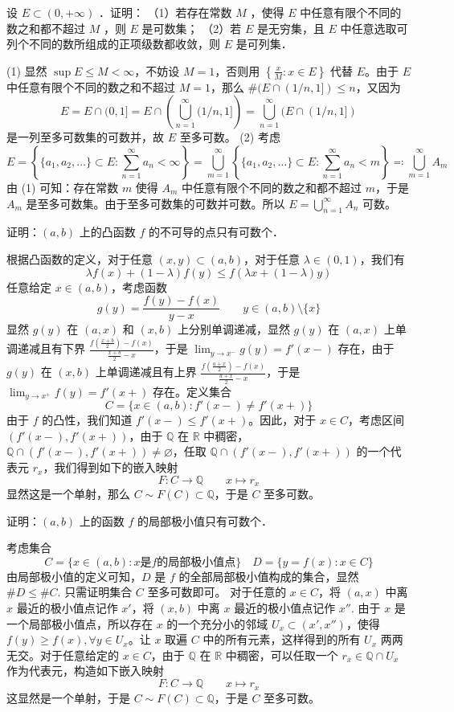 \begin{exercise}
设 $E \subset(0,+\infty)$ ．证明：
（1）若存在常数 $M$ ，使得 $E$ 中任意有限个不同的数之和都不超过 $M$ ，则 $E$ 是可数集；
（2）若 $E$ 是无穷集，且 $E$ 中任意选取可列个不同的数所组成的正项级数都收敛，则 $E$ 是可列集．
\end{exercise}
(1) 显然 $\sup E\leq M<\infty$，不妨设 $M=1$，否则用 $\left\{  \frac{x}{M}:x\in E  \right\}$ 代替 $E$。由于 $E$ 中任意有限个不同的数之和不超过 $M=1$，那么 $\#(E\cap(1/n,1])\leq n$，又因为
\[
E=E\cap(0,1]=E\cap\left( \bigcup_{n=1}^{\infty} (1/n,1] \right)=\bigcup_{n=1}^{\infty} (E\cap(1/n,1])
\]
是一列至多可数集的可数并，故 $E$ 至多可数。
(2) 考虑
\[
E=\left\{  \{ a_1,a_2,\dots \}\subset E:\sum_{n=1}^{\infty} a_n<\infty  \right\}=\bigcup_{m=1}^{\infty} \left\{  \{ a_1,a_2,\dots \}\subset E:\sum_{n=1}^{\infty} a_n<m  \right\}\eqqcolon \bigcup_{m=1}^{\infty} A_m
\]
由 (1) 可知：存在常数 $m$ 使得 $A_m$ 中任意有限个不同的数之和都不超过 $m$，于是 $A_m$ 是至多可数集。由于至多可数集的可数并可数。所以 $E=\bigcup_{n=1}^{\infty}A_n$ 可数。

\begin{exercise}
证明：$(a, b)$ 上的凸函数 $f$ 的不可导的点只有可数个．
\end{exercise}
根据凸函数的定义，对于任意 $(x,y)\subset(a,b)$，对于任意 $\lambda\in(0,1)$，我们有
\[
\lambda f(x)+(1-\lambda)f(y)\leq f(\lambda x+(1-\lambda)y)
\]
任意给定 $x\in(a,b)$，考虑函数
\[
g(y)=\frac{f(y)-f(x)}{y-x}\qquad y\in(a,b)\setminus \{ x \}
\]
显然 $g(y)$ 在 $(a,x)$ 和 $(x,b)$ 上分别单调递减，显然 $g(y)$ 在 $(a,x)$ 上单调递减且有下界 $\frac{f\left( \frac{x+b}{2} \right)-f(x)}{\frac{x+b}{2}-x}$，于是 $\lim_{ y \to x^{-} }g(y)=f'(x-)$ 存在，由于 $g(y)$ 在 $(x,b)$ 上单调递减且有上界 $\frac{f\left( \frac{a+x}{2} \right)-f(x)}{\frac{a+x}{2}-x}$，于是 $\lim_{ y \to x^{+} }f(y)=f'(x+)$ 存在。定义集合
\[
C=\{ x\in(a,b):f'(x-)\neq f'(x+) \}
\]
由于 $f$ 的凸性，我们知道 $f'(x-)\leq f'(x+)$。因此，对于 $x\in C$，考虑区间 $(f'(x-),f'(x+))$，由于 $\mathbb{Q}$ 在 $\mathbb{R}$ 中稠密，$\mathbb{Q}\cap(f'(x-),f'(x+))\neq \varnothing$，任取 $\mathbb{Q}\cap(f'(x-),f'(x+))$ 的一个代表元 $r_{x}$，我们得到如下的嵌入映射
\[
F:C\to \mathbb{Q}\qquad x\mapsto r_{x}
\]
显然这是一个单射，那么 $C\sim F(C)\subset \mathbb{Q}$，于是 $C$ 至多可数。

\begin{exercise}
证明：$(a, b)$ 上的函数 $f$ 的局部极小值只有可数个．
\end{exercise}
考虑集合
\[
C=\{ x\in(a,b):x\text{是}f \text{的局部极小值点} \}\quad D=\{ y=f(x):x\in C \}
\]
由局部极小值的定义可知，$D$ 是 $f$ 的全部局部极小值构成的集合，显然 $\#D \leq\# C$. 只需证明集合 $C$ 至多可数即可。
对于任意的 $x\in C$，将 $(a,x)$ 中离 $x$ 最近的极小值点记作 $x'$，将 $(x,b)$ 中离 $x$ 最近的极小值点记作 $x''$. 由于 $x$ 是一个局部极小值点，所以存在 $x$ 的一个充分小的邻域 $U_{x}\subset(x',x'')$，使得 $f (y)\geq f (x),\forall y\in U_{x}$。让 $x$ 取遍 $C$ 中的所有元素，这样得到的所有 $U_{x}$ 两两无交。对于任意给定的 $x\in C$，由于 $\mathbb{Q}$ 在 $\mathbb{R}$ 中稠密，可以任取一个 $r_{x}\in \mathbb{Q}\cap U_{x}$ 作为代表元，构造如下嵌入映射
\[
F:C\to \mathbb{Q}\qquad x\mapsto r_{x}
\]
这显然是一个单射，于是 $C\sim F(C)\subset \mathbb{Q}$，于是 $C$ 至多可数。

